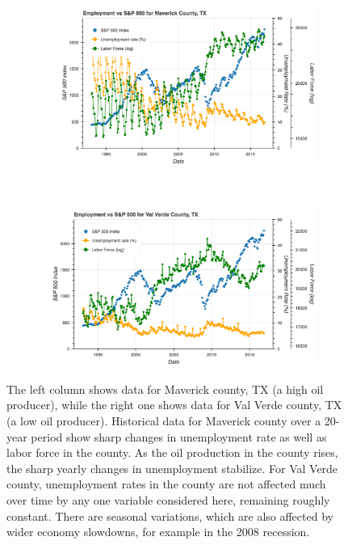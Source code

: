 \documentclass[11pt,letterpaper]{article}
\begin{document}
\begin{figure}
\begin{subfigure}{0.45\textwidth}
\includegraphics[width=1.1\linewidth]{tx_maverick_snp}
\end{subfigure}
~
\begin{subfigure}{0.45\textwidth}
\includegraphics[width=1.1\linewidth]{tx_valverde_snp}
\end{subfigure}

\caption{The left column shows data for Maverick county, TX (a high oil producer), while the right one shows data for Val Verde county, TX (a low oil producer). Historical data for Maverick county over a 20-year period show sharp changes in unemployment rate as well as labor force in the county. As the oil production in the county rises, the sharp yearly changes in unemployment stabilize. For Val Verde county, unemployment rates in the county are not affected much over time by any one variable considered here, remaining roughly constant. There are seasonal variations, which are also affected by wider economy slowdowns, for example in the 2008 recession.}
\label{fig:tx_hist_data}
\end{figure}
\end{document}

